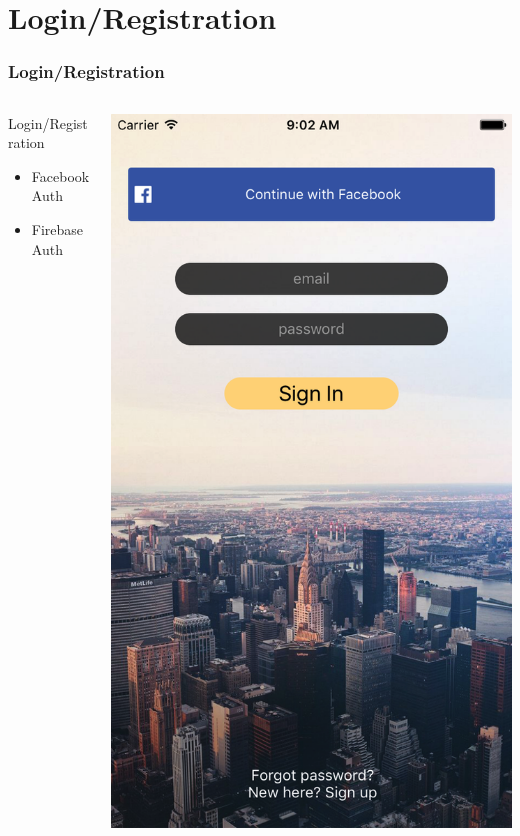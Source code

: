 \documentclass{beamer}
\begin{document}
\section{Login/Registration}
\begin{frame}
\frametitle{Login/Registration}
\begin{columns}
    \begin{column}{0.3\textwidth}
        Login/Registration
        \begin{itemize}
            \item Facebook Auth
            \item Firebase Auth
        \end{itemize}
    \end{column}
    \begin{column}{0.3\textwidth}  %
        \begin{center}
            \includegraphics[scale=0.14]{login}

\end{center}
\end{column}
\end{columns}
\end{frame}
\end{document}
